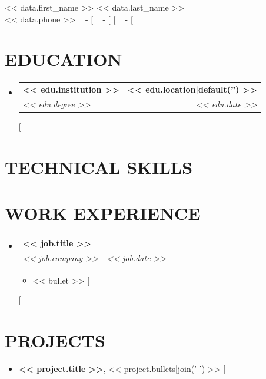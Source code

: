 \documentclass[letterpaper,11pt]{article}
\makeatletter
\newcommand{\resumeItem}[1]{\item\small{{#1 \vspace{-1pt}}}}
\newcommand{\resumeSubheading}[4]{\vspace{-2pt}\item\begin{tabular*}{1.0\textwidth}[t]{l@{\extracolsep{\fill}}r}\textbf{\large#1} & \textbf{\small #2} \\\textit{\large#3} & \textit{\small #4} \\\end{tabular*}\vspace{-7pt}}
\newcommand{\resumeSubHeadingListStart}{\begin{itemize}[leftmargin=0.0in, label={}]}
\newcommand{\resumeSubHeadingListEnd}{\end{itemize}}
\newcommand{\resumeItemListStart}{\begin{itemize}[leftmargin=0.1in]}
\newcommand{\resumeItemListEnd}{\end{itemize}\vspace{-5pt}}
\makeatother
\begin{document}
\begin{center}
    {\huge << data.first_name >> << data.last_name >>} \\ \vspace{2pt} 
    {<< data.phone >>} ~ \small{-}
    \href{mailto:<< data.email >>}{\color{blue}{<< data.email >>}}
    [%
    ~ \small{-} \href{https://<< data.linkedin >>}{\color{blue}{<< data.linkedin >>}} 
    [%
    [%
    ~ \small{-} \href{https://<< data.github >>}{\color{blue}{<< data.github >>}}
    [%
\end{center}

\section{\color{airforceblue}EDUCATION}
  \resumeSubHeadingListStart
    [%
    \resumeSubheading{<< edu.institution >>}{<< edu.location|default('') >>}{<< edu.degree >>}{<< edu.date >>}
    [%
  \resumeSubHeadingListEnd

\section{\color{airforceblue}TECHNICAL SKILLS}
 
\section{\color{airforceblue}WORK EXPERIENCE}
  \resumeSubHeadingListStart
    [%
    \resumeSubheading{<< job.title >>}{}{<< job.company >>}{<< job.date >>}
      \resumeItemListStart
        [%
        \resumeItem{\normalsize{<< bullet >>}}
        [%
      \resumeItemListEnd  
    [%
  \resumeSubHeadingListEnd

\section{\color{airforceblue}PROJECTS}    
    \resumeItemListStart
        [%
        \resumeItem{\normalsize{\textbf{<< project.title >>}, << project.bullets|join(' ') >>}}
        [%
    \resumeItemListEnd   
\end{document}
